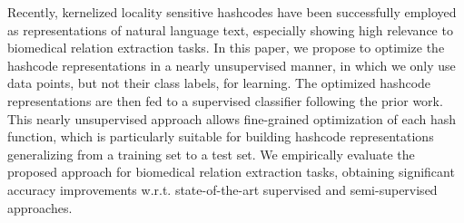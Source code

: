 Recently, kernelized locality sensitive hashcodes have been successfully employed as representations of natural language text, especially showing high relevance to biomedical relation extraction tasks. In this paper, we propose to optimize the hashcode representations in a nearly unsupervised manner, in which we only use data points, but not their class labels, for learning. The optimized hashcode representations are then fed to a supervised classifier following the prior work. This nearly unsupervised approach allows fine-grained optimization
of each hash function, which is particularly suitable for building hashcode representations generalizing from a training set to a test set. We empirically evaluate the proposed approach for biomedical relation extraction tasks, obtaining significant accuracy improvements w.r.t. state-of-the-art supervised and semi-supervised approaches.
